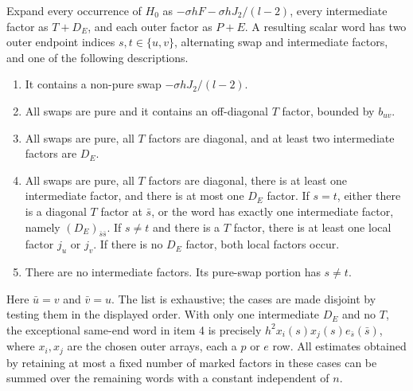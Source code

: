 \begin{lemma}\label{lem:early-index-words}
Expand every occurrence of \(H_0\) as
\(-\sigma h F-\sigma hJ_2/(l-2)\), every intermediate factor as
\(T+D_E\), and each outer factor as \(P+E\). A resulting scalar word
has two outer endpoint indices \(s,t\in\{u,v\}\), alternating
swap and intermediate factors, and one of the following descriptions.
\begin{enumerate}
\item It contains a non-pure swap \(-\sigma hJ_2/(l-2)\).
\item All swaps are pure and it contains an off-diagonal \(T\) factor,
      bounded by \(b_{uv}\).
\item All swaps are pure, all \(T\) factors are diagonal, and at least
      two intermediate factors are \(D_E\).
\item All swaps are pure, all \(T\) factors are diagonal, there is
      at least one intermediate factor, and there is at most one
      \(D_E\) factor. If \(s=t\), either there is a
      diagonal \(T\) factor at \(\bar s\), or the word has exactly
      one intermediate factor, namely \((D_E)_{\bar s\bar s}\).
      If \(s\ne t\) and there is a \(T\) factor, there is at least
      one local factor \(j_u\) or \(j_v\). If there is no \(D_E\)
      factor, both local factors occur.
\item There are no intermediate factors. Its pure-swap portion has
      \(s\ne t\).
\end{enumerate}
Here \(\bar u=v\) and \(\bar v=u\). The list is exhaustive; the cases
are made disjoint by testing them in the displayed order. With only
one intermediate \(D_E\) and no \(T\), the exceptional same-end
word in item 4 is precisely
\(h^2 x_i(s)x_j(s)e_{\bar s}(\bar s)\), where \(x_i,x_j\)
are the chosen outer arrays, each a \(p\) or \(e\) row.
All estimates obtained by retaining at most a fixed number of marked
factors in these cases can be summed over the remaining words with a
constant independent of \(n\).
\end{lemma}
